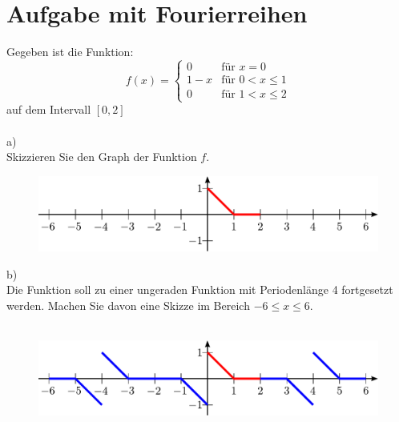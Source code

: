 



\section{Aufgabe mit Fourierreihen}
Gegeben ist die Funktion: 
\[ f(x) = \left\{\begin{array}{ll}
0     &\text{für } x=0\\
1 - x &\text{für } 0 < x \leq 1\\
0     &\text{für } 1 < x \leq 2
\end{array}\right. \]
auf dem Intervall $[0,2]$\\\\
a)\\
Skizzieren Sie den Graph der Funktion $f$. 
\begin{figure}[h!]
\centering
\includegraphics[width=1\textwidth]{fourier0.pdf}
\end{figure}

b)\\
Die Funktion soll zu einer ungeraden Funktion mit Periodenlänge 4 fortgesetzt werden. Machen Sie davon eine Skizze im Bereich $-6 \leq x \leq 6$.\\\\
\begin{figure}[h!]
\centering
\includegraphics[width=1\textwidth]{fourier1.pdf}
\end{figure}

